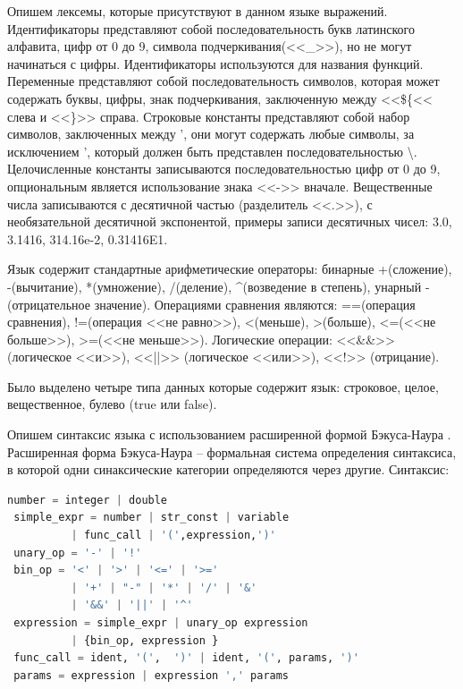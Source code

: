 \documentclass[14pt,a4paper]{reportmod}
\begin{document}
Опишем лексемы, которые присутствуют в данном языке выражений. Идентификаторы представляют собой последовательность букв латинского алфавита, цифр от 0 до 9, символа подчеркивания(<<\_>>), но не могут начинаться с цифры. Идентификаторы используются для названия функций. Переменные представляют собой последовательность символов, которая может содержать буквы, цифры, знак подчеркивания, заключенную между <<\$\{<< слева и <<\}>> справа. Строковые константы представляют собой набор символов, заключенных между ', они могут содержать любые символы, за исключением ', который должен быть представлен последовательностью \textbackslash . Целочисленные константы записываются последовательностью цифр от 0 до 9, опциональным является использование знака <<->> вначале. Вещественные числа записываются с десятичной частью (разделитель <<.>>), с необязательной десятичной экспонентой, примеры записи десятичных чисел: 3.0, 3.1416, 314.16e-2, 0.31416E1.

Язык содержит стандартные арифметические операторы: бинарные +(сложение), -(вычитание), *(умножение), /(деление), \textasciicircum (возведение в степень), унарный -(отрицательное значение). Операциями сравнения являются: ==(операция сравнения), !=(операция <<не равно>>), <(меньше), >(больше), <=(<<не больше>>), >=(<<не меньше>>). Логические операции: <<\&\&>> (логическое <<и>>), <<||>> (логическое <<или>>), <<!>> (отрицание).

Было выделено четыре типа данных которые содержит язык: строковое, целое, вещественное, булево (true или false).

Опишем синтаксис языка с использованием расширенной формой Бэкуса-Наура \cite{refebnf}. Расширенная форма Бэкуса-Наура -- формальная система определения синтаксиса, в которой одни синаксические категории определяются через другие. Синтаксис:

\begin{lstlisting}[language=Python,basicstyle=\small,morekeywords={number,integer,double,simple\_expr, func\_call,unary\_op, expression, params, variable, str\_const, bin\_op, ident},keywordstyle=\it]
 number = integer | double
 simple_expr = number | str_const | variable
          | func_call | '(',expression,')'
 unary_op = '-' | '!'
 bin_op = '<' | '>' | '<=' | '>='
          | '+' | "-" | '*' | '/' | '&'
          | '&&' | '||' | '^'
 expression = simple_expr | unary_op expression
          | {bin_op, expression }
 func_call = ident, '(',  ')' | ident, '(', params, ')'
 params = expression | expression ',' params
\end{lstlisting}
\end{document}
